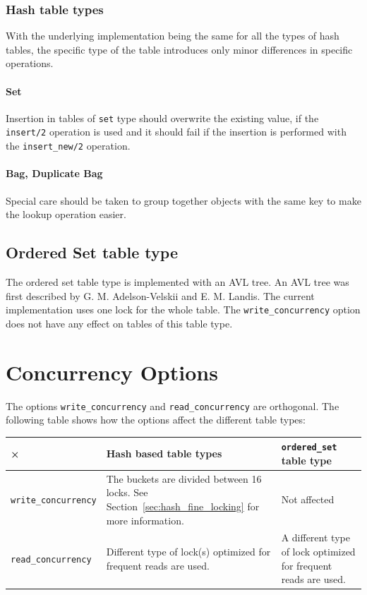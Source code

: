 \documentclass[aps,pre,preprint,nofootinbib]{revtex4}
\begin{document}
\subsubsection{Hash table types}     %

With the underlying implementation being the same for all the types of hash tables, the specific type of the table introduces only minor differences in specific operations.

\paragraph{Set}

Insertion in tables of \verb|set| type should overwrite the existing value, if the \verb|insert/2| operation is used and it should fail if the insertion is performed with the \verb|insert_new/2| operation.

\paragraph{Bag, Duplicate Bag}

Special care should be taken to group together objects with the same key to make the lookup operation easier.

\subsection{Ordered Set table type}

The ordered set table type is implemented with an AVL tree.
An AVL tree was first described by G. M. Adelson-Velskii and E. M. Landis.
The current implementation uses one lock for the whole table.
The \verb|write_concurrency| option does not have any effect on tables of this table type.

\section{Concurrency Options} \label{sec:concurrency_options}

The options \verb|write_concurrency| and \verb|read_concurrency| are orthogonal.
The following table shows how the options affect the different table types:

\begin{center}
\begin{tabular}{l|p{5cm}|p{5cm}}
× & Hash based table types & \verb|ordered_set| table type \\ \hline
\verb|write_concurrency| & 
The buckets are divided between 16 locks. See Section~\ref{sec:hash_fine_locking} for more information. 
& Not affected\\ \hline
\verb|read_concurrency| & 
Different type of lock(s) optimized for frequent reads are used. & 
A different type of lock optimized for frequent reads are used.
\end{tabular}
\end{center} 
\end{document}
